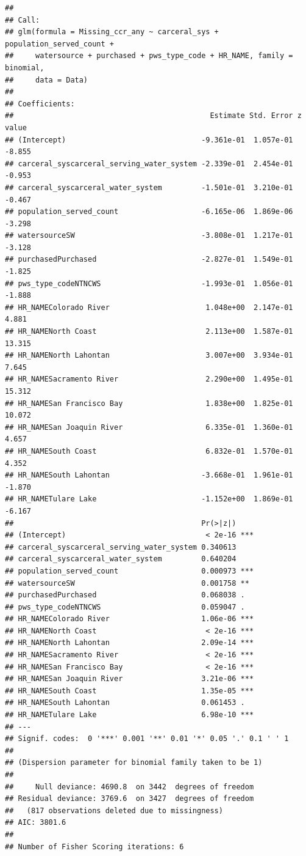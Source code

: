 \documentclass[
]{article}
\begin{document}
\begin{verbatim}
## 
## Call:
## glm(formula = Missing_ccr_any ~ carceral_sys + population_served_count + 
##     watersource + purchased + pws_type_code + HR_NAME, family = binomial, 
##     data = Data)
## 
## Coefficients:
##                                             Estimate Std. Error z value
## (Intercept)                               -9.361e-01  1.057e-01  -8.855
## carceral_syscarceral_serving_water_system -2.339e-01  2.454e-01  -0.953
## carceral_syscarceral_water_system         -1.501e-01  3.210e-01  -0.467
## population_served_count                   -6.165e-06  1.869e-06  -3.298
## watersourceSW                             -3.808e-01  1.217e-01  -3.128
## purchasedPurchased                        -2.827e-01  1.549e-01  -1.825
## pws_type_codeNTNCWS                       -1.993e-01  1.056e-01  -1.888
## HR_NAMEColorado River                      1.048e+00  2.147e-01   4.881
## HR_NAMENorth Coast                         2.113e+00  1.587e-01  13.315
## HR_NAMENorth Lahontan                      3.007e+00  3.934e-01   7.645
## HR_NAMESacramento River                    2.290e+00  1.495e-01  15.312
## HR_NAMESan Francisco Bay                   1.838e+00  1.825e-01  10.072
## HR_NAMESan Joaquin River                   6.335e-01  1.360e-01   4.657
## HR_NAMESouth Coast                         6.832e-01  1.570e-01   4.352
## HR_NAMESouth Lahontan                     -3.668e-01  1.961e-01  -1.870
## HR_NAMETulare Lake                        -1.152e+00  1.869e-01  -6.167
##                                           Pr(>|z|)    
## (Intercept)                                < 2e-16 ***
## carceral_syscarceral_serving_water_system 0.340613    
## carceral_syscarceral_water_system         0.640204    
## population_served_count                   0.000973 ***
## watersourceSW                             0.001758 ** 
## purchasedPurchased                        0.068038 .  
## pws_type_codeNTNCWS                       0.059047 .  
## HR_NAMEColorado River                     1.06e-06 ***
## HR_NAMENorth Coast                         < 2e-16 ***
## HR_NAMENorth Lahontan                     2.09e-14 ***
## HR_NAMESacramento River                    < 2e-16 ***
## HR_NAMESan Francisco Bay                   < 2e-16 ***
## HR_NAMESan Joaquin River                  3.21e-06 ***
## HR_NAMESouth Coast                        1.35e-05 ***
## HR_NAMESouth Lahontan                     0.061453 .  
## HR_NAMETulare Lake                        6.98e-10 ***
## ---
## Signif. codes:  0 '***' 0.001 '**' 0.01 '*' 0.05 '.' 0.1 ' ' 1
## 
## (Dispersion parameter for binomial family taken to be 1)
## 
##     Null deviance: 4690.8  on 3442  degrees of freedom
## Residual deviance: 3769.6  on 3427  degrees of freedom
##   (817 observations deleted due to missingness)
## AIC: 3801.6
## 
## Number of Fisher Scoring iterations: 6
\end{verbatim}
\end{document}
